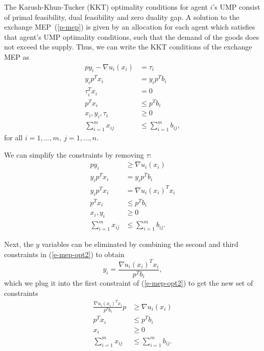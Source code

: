 \documentclass[12pt]{article}
\begin{document}
The Karush-Khun-Tucker (KKT) optimality conditions for agent $i$'s UMP consist of primal feasibility, dual
feasibility and zero duality gap.
A solution to the exchange MEP~(\ref{p-mep})
is given by an allocation for each agent which satisfies that
agent's UMP optimality conditions, such that the demand of the goods
does not exceed the supply.
Thus, we can write the KKT conditions of the exchange MEP as
\begin{equation}
\begin{aligned}
p y_i - \nabla u_i(x_i)&= \tau_i\\
y_i p^T x_i &= y_i p^T b_i\\
\tau_i^T x_i &= 0\\
p^T x_i &\leq p^T b_i\\
x_i, y_i, \tau_i &\geq 0\\
\sum_{i=1}^m x_{ij} &\leq \sum_{i=1}^m b_{ij},
\end{aligned}
\label{e-mep-opt1}
\end{equation}
for all $i=1,\ldots,m,\ j=1,\ldots,n$.

We can simplify the constraints by removing $\tau$:
\begin{equation}
\begin{aligned}
p y_i &\geq \nabla u_i(x_i) \\
y_i p^T x_i &= y_i p^T b_i \\
y_i p^T x_i &= \nabla u_i(x_i)^T x_i\\
p^T x_i &\leq p^T b_i\\
x_i, y_i &\geq 0\\
\sum_{i=1}^m x_{ij} &\leq \sum_{i=1}^m b_{ij}.
\end{aligned}
\label{e-mep-opt2}
\end{equation}

Next, the $y$ variables can be eliminated by combining the second and third constraints in (\ref{e-mep-opt2})
to obtain
\[
y_i = \frac{\nabla u_i(x_i)^T x_i}{p^T b_i},
\]
which we plug it into the first constraint of (\ref{e-mep-opt2}) to get the new set of constraints
\begin{equation}
\begin{aligned}
\frac{\nabla u_i(x_i)^T x_i}{p^T b_i} p &\geq \nabla u_i(x_i) \\
p^T x_i &\leq p^T b_i\\
x_i &\geq 0\\
\sum_{i=1}^m x_{ij} &\leq \sum_{i=1}^m b_{ij}.
\end{aligned}
\label{e-mep-opt3}
\end{equation}
\end{document}
